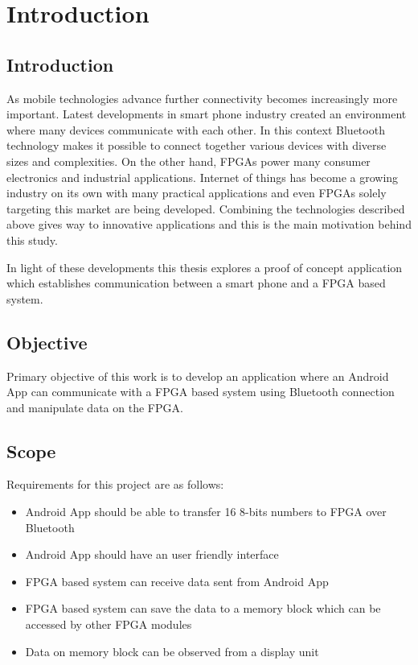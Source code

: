 \chapter{Introduction}
\section{Introduction}
As mobile technologies advance further connectivity becomes increasingly more important. Latest developments in smart phone industry created an environment where many devices communicate with each other. In this context Bluetooth technology makes it possible to connect together various devices with diverse sizes and complexities. On the other hand, FPGAs power many consumer electronics and industrial applications. \cite{eetimes-fpga} Internet of things has become a growing industry on its own with many practical applications and even FPGAs solely targeting this market are being developed. \cite{eetimes-lattice} Combining the technologies described above gives way to innovative applications and this is the main motivation behind this study.

In light of these developments this thesis explores a proof of concept application which establishes communication between a smart phone and a FPGA based system.

\section{Objective}
Primary objective of this work is to develop an application where an Android App can communicate with a FPGA based system using Bluetooth connection and manipulate data on the FPGA.

\section{Scope}
Requirements for this project are as follows:
\begin{itemize}
	\item Android App should be able to transfer 16 8-bits numbers to FPGA over Bluetooth
	\item Android App should have an user friendly interface
	\item FPGA based system can receive data sent from Android App
	\item FPGA based system can save the data to a memory block which can be accessed by other FPGA modules
	\item Data on memory block can be observed from a display unit
\end{itemize}

